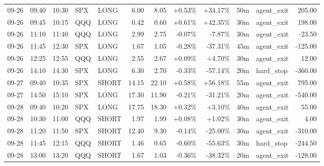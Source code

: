 \documentclass[11pt,a4paper,twoside]{article}
\begin{document}
\begin{center}
\begin{longtable}{>{\color{txtmain}}l l l l l r r r r r >{\color{txtmain}}l r}
09-26 & 09:40 & 10:30 & SPX & LONG & 6.00 & 8.05 & \textcolor{wingreen}{+0.53\%} & \textcolor{wingreen}{+34.17\%} & 50m & agent\_exit & \textcolor{wingreen}{205.00} \\
09-26 & 09:45 & 10:15 & QQQ & LONG & 0.42 & 0.60 & \textcolor{wingreen}{+0.61\%} & \textcolor{wingreen}{+42.35\%} & 30m & agent\_exit & \textcolor{wingreen}{198.00} \\
09-26 & 11:10 & 11:40 & QQQ & LONG & 2.99 & 2.75 & \textcolor{lossred}{-0.07\%} & \textcolor{lossred}{-7.87\%} & 30m & agent\_exit & \textcolor{lossred}{-23.50} \\
09-26 & 11:45 & 12:30 & SPX & LONG & 1.67 & 1.05 & \textcolor{lossred}{-0.28\%} & \textcolor{lossred}{-37.31\%} & 45m & agent\_exit & \textcolor{lossred}{-125.00} \\
09-26 & 12:25 & 12:55 & QQQ & LONG & 2.55 & 2.67 & \textcolor{wingreen}{+0.09\%} & \textcolor{wingreen}{+4.70\%} & 30m & agent\_exit & \textcolor{wingreen}{12.00} \\
09-26 & 14:10 & 14:30 & SPX & LONG & 6.30 & 2.70 & \textcolor{lossred}{-0.33\%} & \textcolor{lossred}{-57.14\%} & 20m & hard\_stop & \textcolor{lossred}{-360.00} \\
09-27 & 09:40 & 10:35 & SPX & SHORT & 14.15 & 22.10 & \textcolor{wingreen}{+0.58\%} & \textcolor{wingreen}{+56.18\%} & 55m & agent\_exit & \textcolor{wingreen}{795.00} \\
09-27 & 14:50 & 15:10 & SPX & LONG & 17.30 & 11.90 & \textcolor{lossred}{-0.21\%} & \textcolor{lossred}{-31.21\%} & 20m & agent\_exit & \textcolor{lossred}{-540.00} \\
09-28 & 09:40 & 10:20 & SPX & LONG & 17.75 & 18.30 & \textcolor{wingreen}{+0.32\%} & \textcolor{wingreen}{+3.10\%} & 40m & agent\_exit & \textcolor{wingreen}{55.00} \\
09-28 & 10:30 & 11:00 & QQQ & SHORT & 1.97 & 1.99 & \textcolor{wingreen}{+0.08\%} & \textcolor{wingreen}{+1.02\%} & 30m & agent\_exit & \textcolor{wingreen}{4.00} \\
09-28 & 11:20 & 11:50 & SPX & SHORT & 12.40 & 9.30 & \textcolor{lossred}{-0.14\%} & \textcolor{lossred}{-25.00\%} & 30m & agent\_exit & \textcolor{lossred}{-310.00} \\
09-28 & 11:45 & 12:15 & QQQ & SHORT & 1.46 & 0.65 & \textcolor{lossred}{-0.60\%} & \textcolor{lossred}{-55.63\%} & 30m & hard\_stop & \textcolor{lossred}{-244.50} \\
09-28 & 13:00 & 13:20 & QQQ & SHORT & 1.67 & 1.03 & \textcolor{lossred}{-0.36\%} & \textcolor{lossred}{-38.32\%} & 20m & agent\_exit & \textcolor{lossred}{-128.00} \\

\end{longtable}
\end{center}
\end{document}
